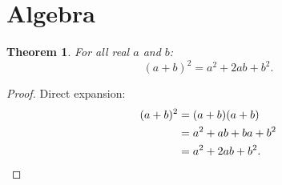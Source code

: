 \documentclass{article}
\newtheorem{theorem}{Theorem}[section]
\begin{document}
\section{Algebra}

\begin{theorem}
\label{thm:square}
For all real $a$ and $b$:
\[
  (a+b)^2 = a^2 + 2ab + b^2.
\]
\end{theorem}

\begin{proof}
Direct expansion:
\begin{align*}
  (a+b)^2 &= (a+b)(a+b) \\
           &= a^2 + ab + ba + b^2 \\
           &= a^2 + 2ab + b^2. \qedhere
\end{align*}
\end{proof}
\end{document}
